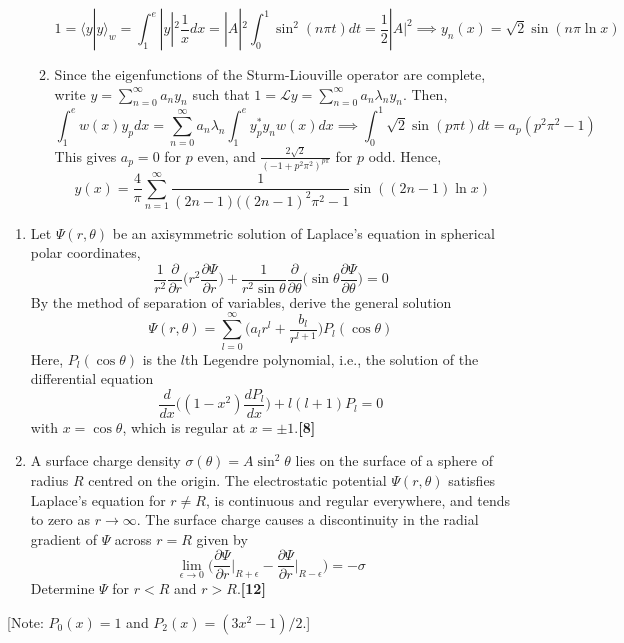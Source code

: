 \documentclass[a4paper]{article}
\begin{document}
\begin{ans}
\begin{enumerate}[label=(\roman*)]
\begin{enumerate}[label=(\alph*)]
$$1=\langle y|y\rangle_w=\int_1^e|y|^2\frac{1}{x}dx=|A|^2\int_0^1\sin^2(n\pi t)dt=\frac{1}{2}|A|^2\implies y_n(x)=\sqrt{2}\sin(n\pi \ln x)$$
\item Since the eigenfunctions of the Sturm-Liouville operator are complete, write $y=\sum_{n=0}^\infty a_ny_n$ such that $1=\mathcal{L}y=\sum_{n=0}^\infty a_n\lambda_ny_n$. Then,
$$\int_1^ew(x)y_pdx=\sum_{n=0}^\infty a_n\lambda_n\int_1^ey_p^*y_nw(x)dx\implies\int_0^1\sqrt{2}\sin(p\pi t)dt=a_p(p^2\pi^2-1)$$
This gives $a_p=0$ for $p$ even, and $\frac{2\sqrt{2}}{(-1+p^2\pi^2)^{p\pi}}$ for $p$ odd. Hence,
$$y(x)=\frac{4}{\pi}\sum_{n=1}^\infty\frac{1}{(2n-1)((2n-1)^2\pi^2-1}\sin((2n-1)\ln x)$$
\end{enumerate}
\end{enumerate}
\end{ans}
\begin{qns}\leavevmode
\begin{enumerate}[label=(\roman*)]
\item Let $\Psi(r,\theta)$ be an axisymmetric solution of Laplace’s equation in spherical polar coordinates,
$$\frac{1}{r^2}\frac{\partial}{\partial r}\bigg(r^2\frac{\partial\Psi}{\partial r}\bigg)+\frac{1}{r^2\sin\theta}\frac{\partial}{\partial\theta}\bigg(\sin\theta\frac{\partial\Psi}{\partial\theta}\bigg)=0$$
By the method of separation of variables, derive the general solution
$$\Psi(r,\theta)=\sum_{l=0}^\infty\bigg(a_lr^l+\frac{b_l}{r^{l+1}}\bigg)P_l(\cos\theta)$$
Here, $P_l(\cos\theta)$ is the $l$th Legendre polynomial, i.e., the solution of the differential equation
$$\frac{d}{dx}\bigg((1-x^2)\frac{dP_l}{dx}\bigg)+l(l+1)P_l=0$$
with $x=\cos\theta$, which is regular at $x =\pm 1$.\hfill\textbf{[8]}
\item A surface charge density $\sigma(\theta)=A\sin^2\theta$ lies on the surface of a sphere of radius $R$ centred on the origin. The electrostatic potential $\Psi(r,\theta)$ satisfies Laplace’s equation for $r\neq R$, is continuous and regular everywhere, and tends to zero as $r\rightarrow\infty$. The surface charge causes a discontinuity in the radial gradient of $\Psi$ across $r = R$ given by
$$\lim_{\epsilon\rightarrow0}\bigg(\frac{\partial\Psi}{\partial r}\bigg|_{R+\epsilon}-\frac{\partial\Psi}{\partial r}\bigg|_{R-\epsilon}\bigg)=-\sigma$$
Determine $\Psi$ for $r < R$ and $r > R$.\hfill\textbf{[12]}
\end{enumerate}
[Note: $P_0(x) = 1$ and $P_2(x) = (3x^2 − 1)/2$.]
\end{qns}
\newpage
\end{document}
